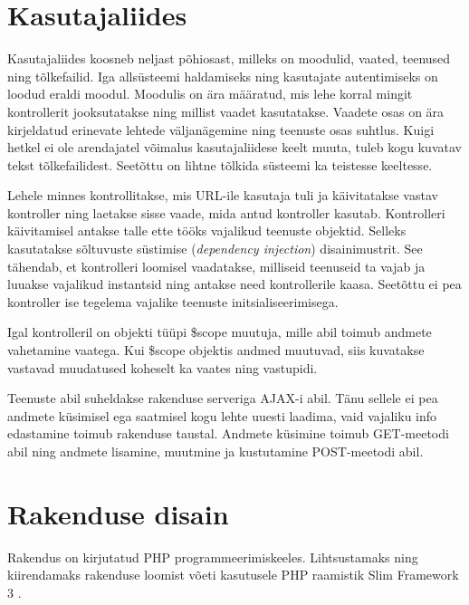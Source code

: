 \documentclass[a4paper,12pt]{article} %
\begin{document}
\section{Kasutajaliides}
Kasutajaliides koosneb neljast põhiosast, milleks on moodulid, vaated, teenused ning tõlkefailid. Iga allsüsteemi haldamiseks ning kasutajate autentimiseks on loodud eraldi moodul. Moodulis on ära määratud, mis lehe korral mingit kontrollerit jooksutatakse ning millist vaadet kasutatakse. Vaadete osas on ära kirjeldatud erinevate lehtede väljanägemine ning teenuste osas suhtlus. Kuigi hetkel ei ole arendajatel võimalus kasutajaliidese keelt muuta, tuleb kogu kuvatav tekst tõlkefailidest. Seetõttu on lihtne tõlkida süsteemi ka teistesse keeltesse.\par
Lehele minnes kontrollitakse, mis URL-ile kasutaja tuli ja käivitatakse vastav kontroller ning laetakse sisse vaade, mida antud kontroller kasutab. Kontrolleri käivitamisel antakse talle ette tööks vajalikud teenuste objektid. Selleks kasutatakse sõltuvuste süstimise (\textit{dependency injection}) disainimustrit. See tähendab, et kontrolleri loomisel vaadatakse, milliseid teenuseid ta vajab ja luuakse vajalikud instantsid ning antakse need kontrollerile kaasa. Seetõttu ei pea kontroller ise tegelema vajalike teenuste initsialiseerimisega.\par
Igal kontrolleril on objekti tüüpi \$scope muutuja, mille abil toimub andmete vahetamine vaatega. Kui \$scope objektis andmed muutuvad, siis kuvatakse vastavad muudatused koheselt ka vaates ning vastupidi.\par
Teenuste abil suheldakse rakenduse serveriga AJAX-i abil. Tänu sellele ei pea andmete küsimisel ega saatmisel kogu lehte uuesti laadima, vaid vajaliku info edastamine toimub rakenduse taustal. Andmete küsimine toimub GET-meetodi abil ning andmete lisamine, muutmine ja kustutamine POST-meetodi abil.

\section{Rakenduse disain}
Rakendus on kirjutatud PHP programmeerimiskeeles. Lihtsustamaks ning kiirendamaks rakenduse loomist võeti kasutusele PHP raamistik Slim Framework 3 \cite{SlimFW}.
\end{document}
